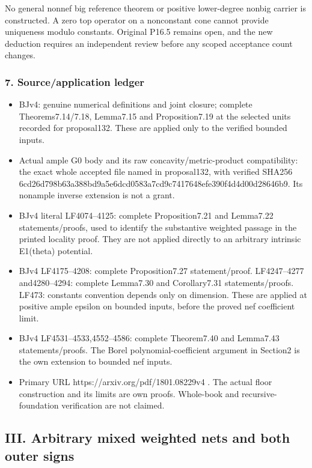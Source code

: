 \documentclass[
]{article}
\providecommand{\tightlist}{%
  \setlength{\itemsep}{0pt}\setlength{\parskip}{0pt}}
\begin{document}
No general nonnef big reference theorem or positive lower-degree nonbig
carrier is constructed. A zero top operator on a nonconstant cone cannot
provide uniqueness modulo constants. Original P16.5 remains open, and
the new deduction requires an independent review before any scoped
acceptance count changes.

\subsubsection{7. Source/application
ledger}\label{sourceapplication-ledger-1}

\begin{itemize}
\tightlist
\item
  BJv4: genuine numerical definitions and joint closure; complete
  Theorems7.14/7.18, Lemma7.15 and Proposition7.19 at the selected units
  recorded for proposal132. These are applied only to the verified
  bounded inputs.
\item
  Actual ample G0 body and its raw concavity/metric-product
  compatibility: the exact whole accepted file named in proposal132,
  with verified SHA256
  6cd26d798b63a388bd9a5e6dcd0583a7cd9c7417648efe390f4d4d00d28646b9. Its
  nonample inverse extension is not a grant.
\item
  BJv4 literal LF4074--4125: complete Proposition7.21 and Lemma7.22
  statements/proofs, used to identify the substantive weighted passage
  in the printed locality proof. They are not applied directly to an
  arbitrary intrinsic E1(theta) potential.
\item
  BJv4 LF4175--4208: complete Proposition7.27 statement/proof.
  LF4247--4277 and4280--4294: complete Lemma7.30 and Corollary7.31
  statements/proofs. LF473: constants convention depends only on
  dimension. These are applied at positive ample epsilon on bounded
  inputs, before the proved nef coefficient limit.
\item
  BJv4 LF4531--4533,4552--4586: complete Theorem7.40 and Lemma7.43
  statements/proofs. The Borel polynomial-coefficient argument in
  Section2 is the own extension to bounded nef inputs.
\item
  Primary URL https://arxiv.org/pdf/1801.08229v4 . The actual floor
  construction and its limits are own proofs. Whole-book and
  recursive-foundation verification are not claimed.
\end{itemize}

\subsection{III. Arbitrary mixed weighted nets and both outer
signs}\label{iii.-arbitrary-mixed-weighted-nets-and-both-outer-signs}
\end{document}
